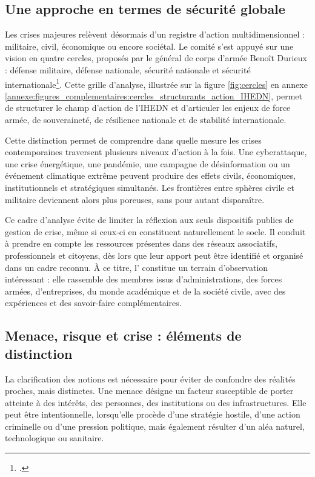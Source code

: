 \subsection{Une approche en termes de sécurité globale}

Les crises majeures relèvent désormais d'un registre d'action multidimensionnel : militaire, civil, économique ou encore sociétal. Le comité s'est appuyé sur une vision en quatre cercles, proposés par le général de corps d'armée Benoît Durieux : défense militaire, défense nationale, sécurité nationale et sécurité internationale\footcite{IHEDN_perimetre_defense_nationale}. Cette grille d'analyse, illustrée sur la figure \ref{fig:cercles} en annexe \ref{annexe:figures_complementaires:cercles_structurants_action_IHEDN}, permet de structurer le champ d'action de l'IHEDN et d'articuler les enjeux de force armée, de souveraineté, de résilience nationale et de stabilité internationale.

Cette distinction permet de comprendre dans quelle mesure les crises contemporaines traversent plusieurs niveaux d'action à la fois. Une cyberattaque, une crise énergétique, une pandémie, une campagne de désinformation ou un événement climatique extrême peuvent produire des effets civils, économiques, institutionnels et stratégiques simultanés. Les frontières entre sphères civile et militaire deviennent alors plus poreuses, sans pour autant disparaître.

Ce cadre d'analyse évite de limiter la réflexion aux seuls dispositifs publics de gestion de crise, même si ceux-ci en constituent naturellement le socle. Il conduit à prendre en compte les ressources présentes dans des réseaux associatifs, professionnels et citoyens, dès lors que leur apport peut être identifié et organisé dans un cadre reconnu. À ce titre, l'\AssociationRegionaleIDF{} constitue un terrain d'observation intéressant : elle rassemble des membres issus d'administrations, des forces armées, d'entreprises, du monde académique et de la société civile, avec des expériences et des savoir-faire complémentaires.

\subsection{Menace, risque et crise : éléments de distinction}

La clarification des notions est nécessaire pour éviter de confondre des réalités proches, mais distinctes. Une menace désigne un facteur susceptible de porter atteinte à des intérêts, des personnes, des institutions ou des infrastructures. Elle peut être intentionnelle, lorsqu'elle procède d'une stratégie hostile, d'une action criminelle ou d'une pression politique, mais également résulter d'un aléa naturel, technologique ou sanitaire.

